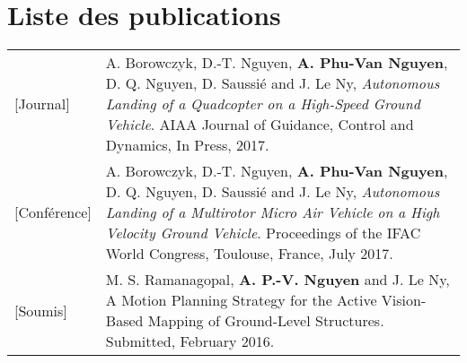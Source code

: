 \chapter*{Liste des publications}

\begin{longtable}{lp{5in}}
  [Journal]     & A. Borowczyk, D.-T. Nguyen, \textbf{A. Phu-Van Nguyen}, D. Q. Nguyen, D. Saussié and J. Le Ny, \textit{Autonomous Landing of a Quadcopter on a High-Speed Ground Vehicle}. AIAA Journal of Guidance, Control and Dynamics, In Press, 2017.\\

  [Conférence]  & A. Borowczyk, D.-T. Nguyen, \textbf{A. Phu-Van Nguyen}, D. Q. Nguyen, D. Saussié and J. Le Ny, \textit{Autonomous Landing of a Multirotor Micro Air Vehicle on a High Velocity Ground Vehicle}. Proceedings of the IFAC World Congress, Toulouse, France, July 2017.\\

  [Soumis]      & M. S. Ramanagopal, \textbf{A. P.-V. Nguyen} and J. Le Ny, A Motion Planning Strategy for the Active Vision-Based Mapping of Ground-Level Structures. Submitted, February 2016.
\end{longtable}
